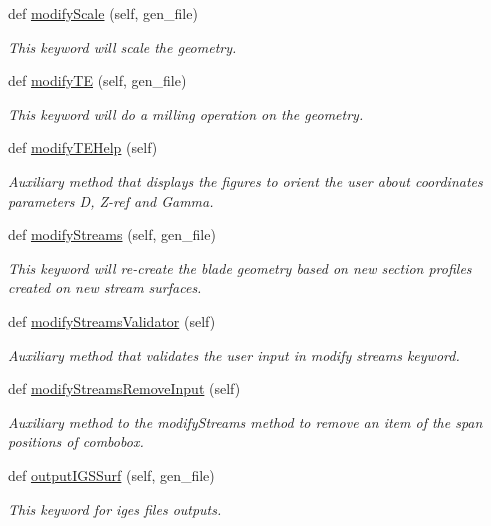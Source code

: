 \begin{DoxyCompactItemize}
def \hyperlink{a00071_aa1bef88b3d57a567e44548155e7ec02f}{modify\+Scale} (self, gen\+\_\+file)
\begin{DoxyCompactList}\small\item\em This keyword will scale the geometry. \end{DoxyCompactList}\item 
def \hyperlink{a00071_a52d4edd27f78b5559e6e3683c6adb3bc}{modify\+TE} (self, gen\+\_\+file)
\begin{DoxyCompactList}\small\item\em This keyword will do a milling operation on the geometry. \end{DoxyCompactList}\item 
def \hyperlink{a00071_a0894116159595156b62859c796bdea1d}{modify\+T\+E\+Help} (self)
\begin{DoxyCompactList}\small\item\em Auxiliary method that displays the figures to orient the user about coordinates parameters D, Z-\/ref and Gamma. \end{DoxyCompactList}\item 
def \hyperlink{a00071_a66f6209a0c4caa0ba5e25b5fd913eff5}{modify\+Streams} (self, gen\+\_\+file)
\begin{DoxyCompactList}\small\item\em This keyword will re-\/create the blade geometry based on new section profiles created on new stream surfaces. \end{DoxyCompactList}\item 
def \hyperlink{a00071_af60dda179dc289691a59b52cb8ed3e70}{modify\+Streams\+Validator} (self)
\begin{DoxyCompactList}\small\item\em Auxiliary method that validates the user input in modify streams keyword. \end{DoxyCompactList}\item 
def \hyperlink{a00071_ade4195a752861e46586e7b163136620f}{modify\+Streams\+Remove\+Input} (self)
\begin{DoxyCompactList}\small\item\em Auxiliary method to the modify\+Streams method to remove an item of the span positions of combobox. \end{DoxyCompactList}\item 
def \hyperlink{a00071_ada62706610465b6ba0d6fe5070cdbb9c}{output\+I\+G\+S\+Surf} (self, gen\+\_\+file)
\begin{DoxyCompactList}\small\item\em This keyword for iges files outputs. \end{DoxyCompactList}\item 

\end{DoxyCompactItemize}
